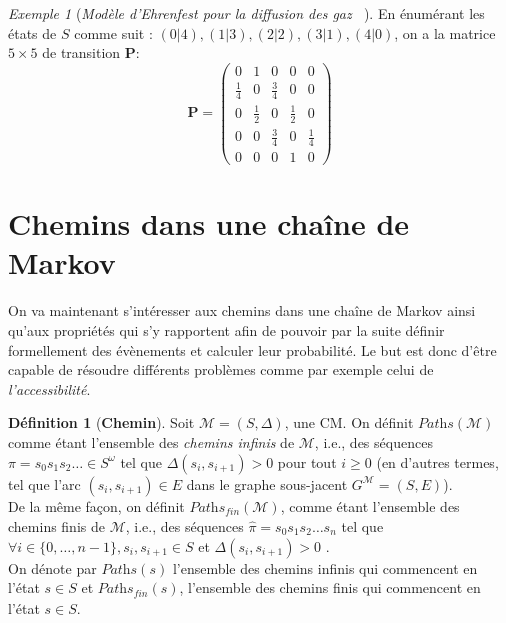 \documentclass[12pt,a4paper]{report}
\theoremstyle{definition}%
\newtheorem{definition}{Définition}[chapter]
\theoremstyle{remark}
\newtheorem{example}{Exemple}[chapter]
\newcommand{\ie}{i.e., }
\begin{document}
\begin{example}[\textit{Modèle d'Ehrenfest pour la diffusion des gaz ~\cite{Course3}}]
	En énumérant les états de $S$ comme suit : $(0|4), (1|3), (2|2), (3|1), (4|0)$, on a la matrice $5\times5$ de transition $\textbf{P}$:
	\[
		\textbf{P} =
			\begin{pmatrix}
			0 & 1 & 0 & 0 & 0 \\
			\frac{1}{4} & 0 & \frac{3}{4}& 0 & 0 \\
			0 & \frac{1}{2} & 0 & \frac{1}{2} & 0 \\
			0 & 0 & \frac{3}{4} & 0 & \frac{1}{4} \\
			0 & 0 & 0 & 1 & 0
			\end{pmatrix}
	\]
\end{example}

\section{Chemins dans une chaîne de Markov}
On va maintenant s'intéresser aux chemins dans une chaîne de Markov ainsi qu'aux propriétés qui s'y rapportent afin de pouvoir par la suite définir formellement des évènements et calculer leur probabilité. Le but est donc d'être capable de résoudre différents problèmes comme par exemple celui de \textit{l'accessibilité}.

\begin{definition}[\textbf{Chemin}]
	Soit $\mathcal{M} = (S, \Delta)$, une CM.
	On définit $\textit{Paths}(\mathcal{M})$ comme étant l'ensemble des \textit{chemins infinis} de $\mathcal{M}$, \ie des séquences $\pi = s_0 s_1 s_2 \dots \in S^\omega$ tel que $\Delta(s_i, s_{i+1}) > 0$ pour tout $i \geq 0$ (en d'autres termes, tel que l'arc $(s_i, s_{i+1}) \in E$ dans le graphe sous-jacent $G^\mathcal{M} = (S, E)$).\\
	De la même façon, on définit $\textit{Paths}_\textit{fin}(\mathcal{M})$, comme étant l'ensemble des chemins finis de $\mathcal{M}$, \ie des séquences $\hat{\pi} = s_0 s_1 s_2 \dots s_n$ tel que $\forall i \in \{0, \dots, n-1\}, s_i, s_{i+1} \in S$ et $\Delta(s_i, s_{i+1}) > 0$ .\\
	On dénote par $\textit{Paths}(s)$ l'ensemble des chemins infinis qui commencent en l'état $s \in S$ et $\textit{Paths}_\textit{fin}(s)$, l'ensemble des chemins finis qui commencent en l'état $s \in S$.
\end{definition}
\end{document}
